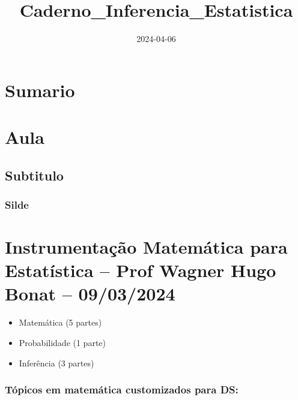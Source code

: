 \documentclass[
]{article}
\title{Caderno\_Inferencia\_Estatistica}
\author{}
\date{\vspace{-2.5em}2024-04-06}
\providecommand{\tightlist}{%
  \setlength{\itemsep}{0pt}\setlength{\parskip}{0pt}}
\begin{document}
\maketitle

\hypertarget{sumario}{%
\section{Sumario}\label{sumario}}

\hypertarget{aula}{%
\section{Aula}\label{aula}}

\hypertarget{subtitulo}{%
\subsection{Subtitulo}\label{subtitulo}}

\hypertarget{silde}{%
\subsubsection{Silde}\label{silde}}

\hypertarget{instrumentauxe7uxe3o-matemuxe1tica-para-estatuxedstica-prof-wagner-hugo-bonat-09032024}{%
\section{Instrumentação Matemática para Estatística -- Prof Wagner Hugo
Bonat --
09/03/2024}\label{instrumentauxe7uxe3o-matemuxe1tica-para-estatuxedstica-prof-wagner-hugo-bonat-09032024}}

\begin{itemize}
\tightlist
\item
  Matemática (5 partes)
\item
  Probabilidade (1 parte)
\item
  Inferência (3 partes)
\end{itemize}

\hypertarget{tuxf3picos-em-matemuxe1tica-customizados-para-ds}{%
\subsubsection{Tópicos em matemática customizados para
DS:}\label{tuxf3picos-em-matemuxe1tica-customizados-para-ds}}
\end{document}
